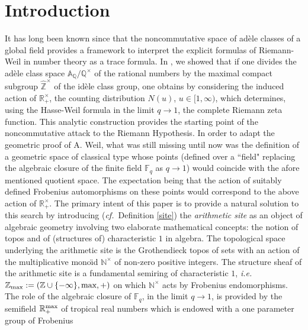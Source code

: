 \documentclass[noams,lp]{compositio}
\def\A{{\mathbb A}}
\def\F{{\mathbb F}}
\def\N{{\mathbb N}}
\def\Q{{\mathbb Q}}
\def\R{{\mathbb R}}
\def\Z{{\mathbb Z}}
\newcommand{\ie}{{\it i.e.\/}\ }
\newcommand{\cf}{{\it cf.}}
\def\rmax{\R_+^{\rm max}}
\def\nt{\N^{\times}}
\def\hatz{{\hat\Z^\times}}
\begin{document}
\maketitle
\vspace*{1pt}
\tableofcontents  %





\section{Introduction}

  It has long been known since \cite{Co-zeta} that the noncommutative space of ad\`ele classes of a global field provides a framework to interpret the explicit formulas of Riemann-Weil in number theory as a trace formula. In \cite{CC1}, we showed that if one divides the ad\`ele class space $\A_\Q/\Q^\times$ of the rational numbers by the maximal compact subgroup $\hatz$ of the id\`ele class group,  one obtains by considering the induced action of $\R_+^\times$, the counting distribution $N(u)$, $u\in [1,\infty)$, which determines, using the Hasse-Weil formula in the limit $q\to 1$, the complete Riemann zeta function. This analytic construction provides the starting point of the noncommutative attack to the Riemann Hypothesis. In order to adapt the  geometric proof of A. Weil, what was still missing until now was the definition of a geometric space of classical type whose points (defined over a ``field" replacing the algebraic closure of the  finite field $\F_q$ as $q\to 1$) would coincide with the afore mentioned quotient space. The expectation being that the action of suitably defined Frobenius automorphisms on these points would correspond to the above action of $\R_+^\times$.\newline
The primary intent of this paper is to provide a natural solution to this  search by introducing (\cf ~Definition \ref{site})  the {\em arithmetic site}  as an object  of algebraic geometry involving two elaborate mathematical concepts: the notion of topos and of (structures of) characteristic $1$ in algebra. 
 The topological space underlying the arithmetic site is the Grothendieck topos of sets with an action of  the multiplicative mono\"{\i}d $\nt$ of non-zero positive integers. The  structure sheaf of the arithmetic site is a 
 fundamental semiring of characteristic $1$, \ie $\Z_{\rm max}:= (\Z\cup\{-\infty\},\text{max},+)$ on which $\nt$ acts by  Frobenius endomorphisms. The role of the algebraic closure  of $\F_q$, in the limit $q\to 1$, is provided by the semifield $\rmax$ of tropical real numbers which  is endowed with a one parameter group of  Frobenius
\end{document}
